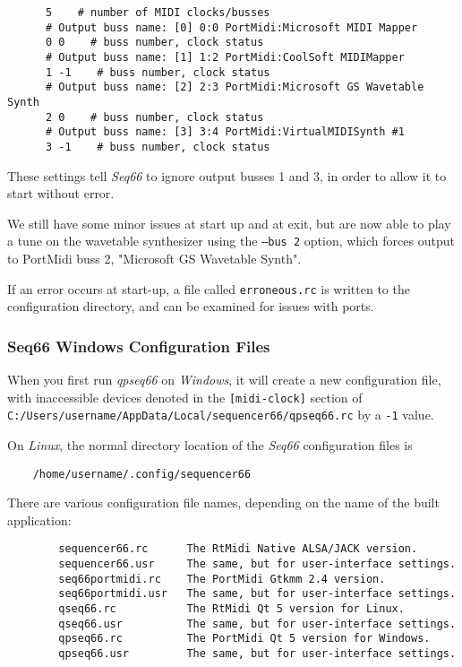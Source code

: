 \begin{verbatim}
      5    # number of MIDI clocks/busses
      # Output buss name: [0] 0:0 PortMidi:Microsoft MIDI Mapper
      0 0    # buss number, clock status
      # Output buss name: [1] 1:2 PortMidi:CoolSoft MIDIMapper
      1 -1    # buss number, clock status
      # Output buss name: [2] 2:3 PortMidi:Microsoft GS Wavetable Synth
      2 0    # buss number, clock status
      # Output buss name: [3] 3:4 PortMidi:VirtualMIDISynth #1
      3 -1    # buss number, clock status
\end{verbatim}

   These settings tell \textsl{Seq66} to ignore output busses 1 and 3,
   in order to allow it to start without error.

    We still have some minor issues at start up and at exit, but are now able
    to play a tune on the wavetable synthesizer using the
    \texttt{--bus 2} option, which forces output to PortMidi buss 2,
    "Microsoft GS Wavetable Synth".

    If an error occurs at start-up, a file called \texttt{erroneous.rc} is
    written to the configuration directory, and can be examined for issues with
    ports.

\subsubsection{Seq66 Windows Configuration Files}
\label{subsubsec:qt_portmidi_windows_setup_config}

    When you first run \textsl{qpseq66}
    on \textsl{Windows}, it will create a new configuration
    file, with inaccessible devices denoted in the
    \texttt{[midi-clock]} section of
    \texttt{C:/Users/username/AppData/Local/sequencer66/qpseq66.rc}
    by a \texttt{-1} value.

    On \textsl{Linux},
    the normal directory location of the \textsl{Seq66} configuration
    files is

\begin{verbatim}
    /home/username/.config/sequencer66
\end{verbatim}

   There are various configuration file names, depending on the name of the
   built application:

\begin{verbatim}
        sequencer66.rc      The RtMidi Native ALSA/JACK version.
        sequencer66.usr     The same, but for user-interface settings.
        seq66portmidi.rc    The PortMidi Gtkmm 2.4 version.
        seq66portmidi.usr   The same, but for user-interface settings.
        qseq66.rc           The RtMidi Qt 5 version for Linux.
        qseq66.usr          The same, but for user-interface settings.
        qpseq66.rc          The PortMidi Qt 5 version for Windows.
        qpseq66.usr         The same, but for user-interface settings.
\end{verbatim}

